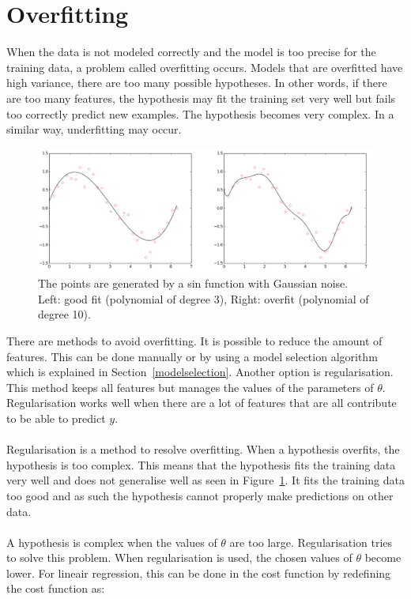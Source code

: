 \section{Overfitting}
\label{overfitting}
When the data is not modeled correctly and the model is too precise for the training data, a problem called overfitting occurs. Models that are overfitted have high variance, there are too many possible hypotheses. In other words, if there are too many features, the hypothesis may fit the training set very well but fails too correctly predict new examples. The hypothesis becomes very complex. In a similar way, underfitting may occur.
\begin{figure}[H]
\centering
\includegraphics[width=1.2\textwidth]{Figures/overfit}
\decoRule
\caption[Overfitting]{The points are generated by a sin function with Gaussian noise. Left: good fit (polynomial of degree 3), Right: overfit (polynomial of degree 10). \cite{overfit-fig}}
\label{fig:overfitting}
\end{figure}
\noindent There are methods to avoid overfitting. It is possible to reduce the amount of features.  This can be done manually or by using a model selection algorithm which is explained in Section~\ref{modelselection}. Another option is regularisation. This method keeps all features but manages the values of the parameters of $\theta$.  Regularisation works well when there are a lot of features that are all contribute to be able to predict $y$.\\\\
Regularisation is a method to resolve overfitting. When a hypothesis overfits, the hypothesis is too complex. This means that the hypothesis fits the training data very well and does not generalise well as seen in Figure~\ref{fig:overfitting}. It fits the training data too good and as such the hypothesis cannot properly make predictions on other data. \\
\\
A hypothesis is complex when the values of $\theta$ are too large. Regularisation tries to solve this problem. When regularisation is used, the chosen values of $\theta$ become lower. For lineair regression, this can be done in the cost function by redefining the cost function as:
